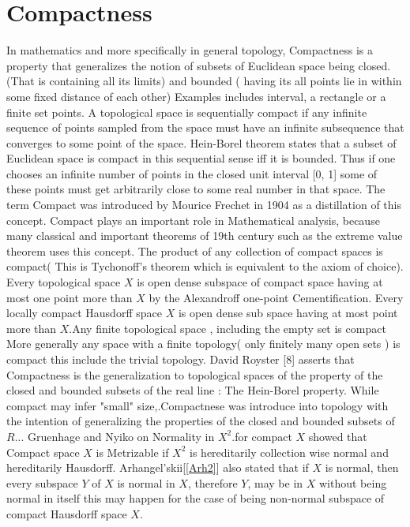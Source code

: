 \documentclass[PhD,14,a4paper]{report}
\theoremstyle{plain}
\theoremstyle{definition}
\theoremstyle{remark}
\numberwithin{figure}{section}
\numberwithin{equation}{subsection}
\begin{document}
{ \section{Compactness}
\noindent In mathematics and more specifically in general topology, Compactness is a property that generalizes the notion of subsets of Euclidean space being closed. (That is containing all its limits) and bounded ( having its all points lie in within some fixed distance of each other) Examples includes interval, a rectangle or a finite set points. A topological space is sequentially compact if any infinite sequence of points sampled from the space must have an infinite subsequence that converges to some point of the space. Hein-Borel theorem states that a subset of Euclidean space is compact in this sequential sense iff it is bounded. Thus if one chooses an infinite number of points in the closed unit interval [0, 1] some of these points must get arbitrarily close  to some real number in that space. The term Compact was introduced by Mourice Frechet in 1904 as a distillation of this concept. Compact plays an important role in Mathematical analysis, because many classical and important theorems of 19th century such as the extreme value theorem uses this concept. The product of any collection of compact spaces is compact( This is Tychonoff's theorem which is equivalent to the axiom of choice). Every topological space $X$ is open dense subspace of compact space having at most one point more than $X$ by the Alexandroff one-point Cementification. Every locally compact Hausdorff space $X$ is open dense sub space having at most point more than $X$.Any finite topological space , including the empty set is compact More generally any space with a finite topology( only finitely many open sets ) is compact this include the trivial topology. David Royster [8] asserts that Compactness is the generalization to topological spaces of the property  of the closed and bounded subsets of the real line : The Hein-Borel property. While compact may infer "small" size,.Compactnese was introduce into topology with the intention of generalizing the properties of the closed and bounded subsets of $R...$ Gruenhage and Nyiko on Normality in $X^2$.for compact $X$ showed that Compact space $X$ is Metrizable if $X^2$ is hereditarily collection wise normal and hereditarily Hausdorff. Arhangel'skii[\ref{Arh2}] also stated that if $X$ is normal, then every subspace $Y$ of $X$ is normal in $X$, therefore $Y$, may be in $X$ without being normal in itself this may happen for the case of being non-normal subspace of compact Hausdorff space $X$.

}
\end{document}
